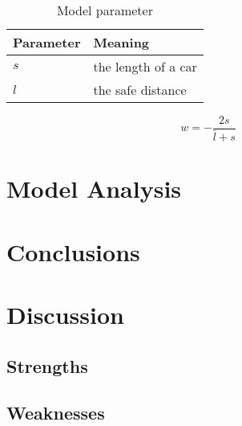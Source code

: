 \begin{table}
\centering
\begin{tabular}{ll}
\hline
Parameter & Meaning\\
\hline
$s$ & the length of a car \\
$l$ & the safe distance \\
\hline
\end{tabular}
\caption{Model parameter}
\end{table}

\begin{equation}
w = - \frac{2s}{\bar{l} + s} 
\end{equation}
  

\section{Model Analysis}



\section{Conclusions}




\section{Discussion}

\subsection{Strengths}
	
\subsection{Weaknesses}




